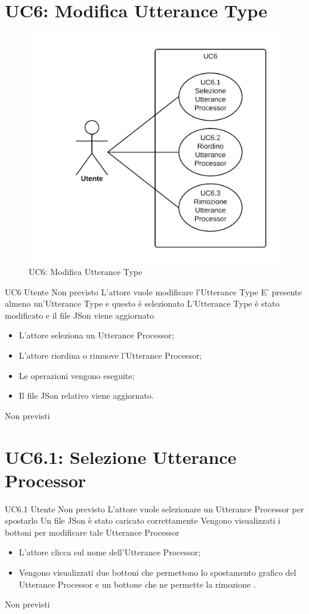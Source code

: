 \documentclass[../AnalisideiRequisiti.tex]{subfiles}
\begin{document}
\section{UC6: Modifica Utterance Type}
\begin{figure}[H]
	\centering
	\includegraphics[width=\textwidth]{../img/UC6.png}
	\caption{UC6: Modifica Utterance Type}
\end{figure}
\UserCase
{UC6}
{Utente}
{Non previsto}
{L'attore vuole modificare l'Utterance Type}
{E' presente almeno un'Utterance Type e questo è selezionato }
{L'Utterance Type è stato modificato e il file JSon viene aggiornato}
{
	\begin{itemize}
		\item{} L'attore seleziona un Utterance Processor;
		\item{} L'attore riordina o rimuove l'Utterance Processor;	
		\item{} Le operazioni vengono eseguite;
		\item{} Il file JSon relativo viene aggiornato.	
	\end{itemize}
}
{Non previsti}

\section{UC6.1: Selezione Utterance Processor}
\UserCase
{UC6.1}
{Utente}
{Non previsto}
{L'attore vuole selezionare un Utterance Processor per spostarlo}
{Un file JSon è stato caricato correttamente }
{Vengono visualizzati i bottoni per modificare tale Utterance Processor}
{
	\begin{itemize}
		\item{} L'attore clicca sul nome dell'Utterance Processor;
		\item{} Vengono visualizzati due bottoni che permettono lo spostamento grafico del Utterance Processor  e un bottone che ne permette la rimozione . 		
	\end{itemize}
}
{Non previsti}
\end{document}
